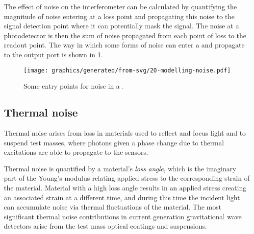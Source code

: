 The effect of noise on the interferometer can be calculated by quantifying the magnitude of noise entering at a loss point and propagating this noise to the signal detection point where it can potentially mask the signal. The noise at a photodetector is then the sum of noise propagated from each point of loss to the readout point. The way in which some forms of noise can enter a \MI{} and propagate to the output port is shown in \cref{fig:modelling-noise}.

\begin{figure}
  \centering
  \texttt{[image: graphics/generated/from-svg/20-modelling-noise.pdf]}
  \caption[Some entry points for noise in a \MI{}]{\label{fig:modelling-noise}Some entry points for noise in a \MI{}.}
\end{figure}

\subsection{Thermal noise}
Thermal noise arises from loss in materials used to reflect and focus light and to suspend test masses, where photons given a phase change due to thermal excitations are able to propagate to the sensors.

Thermal noise is quantified by a material's \emph{loss angle}, which is the imaginary part of the Young's modulus relating applied stress to the corresponding strain of the material. Material with a high loss angle results in an applied stress creating an associated strain at a different time, and during this time the incident light can accumulate noise via thermal fluctuations of the material. The most significant thermal noise contributions in current generation gravitational wave detectors arise from the test mass optical coatings and suspensions.

